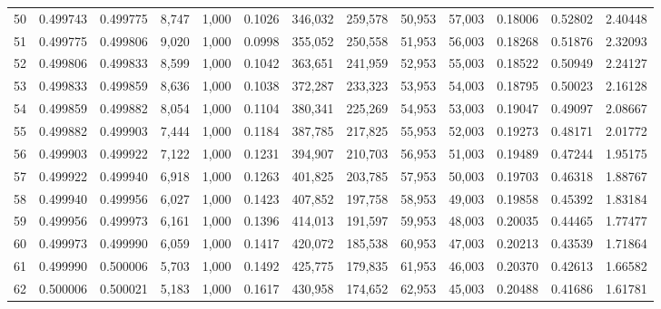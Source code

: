 \begin{tabular}{rrrrrrrrrrrrr}
50  &  0.499743 &  0.499775 &  8,747 &  1,000 &                                     0.1026 &  346,032 &  259,578 &   50,953 &   57,003 &  0.18006 &  0.52802 &  2.40448 \\
51  &  0.499775 &  0.499806 &  9,020 &  1,000 &                                     0.0998 &  355,052 &  250,558 &   51,953 &   56,003 &  0.18268 &  0.51876 &  2.32093 \\
52  &  0.499806 &  0.499833 &  8,599 &  1,000 &                                     0.1042 &  363,651 &  241,959 &   52,953 &   55,003 &  0.18522 &  0.50949 &  2.24127 \\
53  &  0.499833 &  0.499859 &  8,636 &  1,000 &                                     0.1038 &  372,287 &  233,323 &   53,953 &   54,003 &  0.18795 &  0.50023 &  2.16128 \\
54  &  0.499859 &  0.499882 &  8,054 &  1,000 &                                     0.1104 &  380,341 &  225,269 &   54,953 &   53,003 &  0.19047 &  0.49097 &  2.08667 \\
55  &  0.499882 &  0.499903 &  7,444 &  1,000 &                                     0.1184 &  387,785 &  217,825 &   55,953 &   52,003 &  0.19273 &  0.48171 &  2.01772 \\
56  &  0.499903 &  0.499922 &  7,122 &  1,000 &                                     0.1231 &  394,907 &  210,703 &   56,953 &   51,003 &  0.19489 &  0.47244 &  1.95175 \\
57  &  0.499922 &  0.499940 &  6,918 &  1,000 &                                     0.1263 &  401,825 &  203,785 &   57,953 &   50,003 &  0.19703 &  0.46318 &  1.88767 \\
58  &  0.499940 &  0.499956 &  6,027 &  1,000 &                                     0.1423 &  407,852 &  197,758 &   58,953 &   49,003 &  0.19858 &  0.45392 &  1.83184 \\
59  &  0.499956 &  0.499973 &  6,161 &  1,000 &                                     0.1396 &  414,013 &  191,597 &   59,953 &   48,003 &  0.20035 &  0.44465 &  1.77477 \\
60  &  0.499973 &  0.499990 &  6,059 &  1,000 &                                     0.1417 &  420,072 &  185,538 &   60,953 &   47,003 &  0.20213 &  0.43539 &  1.71864 \\
61  &  0.499990 &  0.500006 &  5,703 &  1,000 &                                     0.1492 &  425,775 &  179,835 &   61,953 &   46,003 &  0.20370 &  0.42613 &  1.66582 \\
62  &  0.500006 &  0.500021 &  5,183 &  1,000 &                                     0.1617 &  430,958 &  174,652 &   62,953 &   45,003 &  0.20488 &  0.41686 &  1.61781 \\

\end{tabular}
